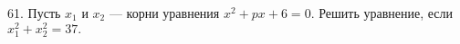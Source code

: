 61. Пусть $x_1$ и $x_2$ --- корни уравнения $x^2+px+6=0.$ Решить уравнение, если $x_1^2+x_2^2=37.$\\
